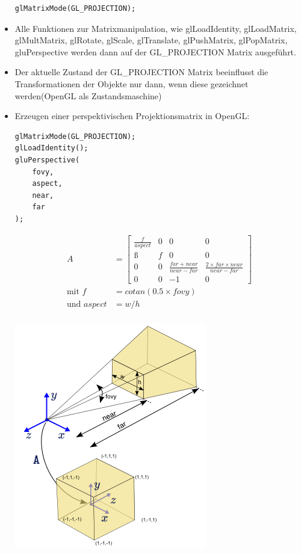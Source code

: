 \documentclass{scrartcl}
\begin{document}
\begin{itemize}
	\begin{lstlisting}
glMatrixMode(GL_PROJECTION);
	\end{lstlisting}
	\item Alle Funktionen zur Matrixmanipulation, wie glLoadIdentity, glLoadMatrix, glMultMatrix, glRotate, glScale, glTranslate, glPushMatrix, glPopMatrix, gluPerspective werden dann auf der GL\_PROJECTION Matrix ausgeführt.
	\item Der aktuelle Zustand der GL\_PROJECTION Matrix beeinflusst die Transformationen der Objekte nur dann, wenn diese gezeichnet werden(OpenGL als Zustandsmaschine)
	\item Erzeugen einer perspektivischen Projektionsmatrix in OpenGL: \\
	\begin{lstlisting}
glMatrixMode(GL_PROJECTION);
glLoadIdentity();
gluPerspective(
	fovy,
	aspect,
	near,
	far
);
	\end{lstlisting}
	\begin{equation}
		\begin{split}
			A &= \begin{bmatrix}
			\frac{f}{aspect} & 0 & 0 & 0 \\
			ß & f & 0 & 0 \\
			0 & 0 & \frac{far + near}{near - far} & \frac{2 \times far \times near}{near - far} \\
			0 & 0& -1 & 0
			\end{bmatrix} \\
			\text{mit } f &= cotan(0.5 \times fovy) \\
			\text{und } aspect &= w/h
		\end{split}
	\end{equation} \\
	\includegraphics[scale=0.5]{figures/gluperspective.png}
\end{itemize}
\end{document}
